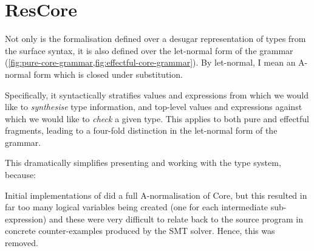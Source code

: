 \section{ResCore}\label{sec:rescore}

Not only is the formalisation defined over a desugar representation of types
from the surface  syntax, it is also defined over the let-normal form of
the  grammar
(\cref{fig:pure-core-grammar,fig:effectful-core-grammar}). By let-normal, I
mean an A-normal form which is closed under
substitution.

Specifically, it syntactically stratifies values and
expressions from which we would like to \emph{synthesise} type information, and
top-level values and expressions against which we would like to \emph{check} a
given type. This applies to both pure and effectful fragments, leading to a
four-fold distinction in the let-normal form of the grammar.

This dramatically simplifies presenting and working with the type system, because:

Initial implementations of  did a full A-normalisation of Core, but this resulted
in far too many logical variables being created (one for each intermediate
sub-expression) and these were very difficult to relate back to the source
program in concrete counter-examples produced by the SMT
solver. Hence, this was
removed.\label{sn:rm-anorm}

